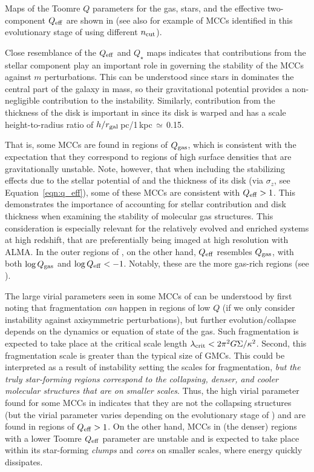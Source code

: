 \IfFileExists{emulateapjlegacy.cls}{\documentclass[iop]{emulateapjlegacy}}{\documentclass[iop]{emulateapj}}
\begin{document}
Maps of the Toomre $Q$ parameters for the gas, stars, and the effective two-component $Q_{\rm eff}$ are shown in 
(see also  for example of MCCs identified in this evolutionary stage of \flower
using different $n_{\rm cut}$). 

Close resemblance of the $Q_{\rm eff}$ and $Q_{\star}$ maps indicates that contributions from the stellar component play an important role in governing the stability of the MCCs against $m$ perturbations. This can be understood since stars in \flower dominates the central part of the galaxy in mass, so their gravitational potential provides a non-negligible contribution to the instability.
Similarly, contribution from the thickness of the disk is important in \flower since its disk is warped and 
has a scale height-to-radius ratio of $h/r_{\rm gal}$\,pc/1\,kpc\,$\simeq$\,0.15.

That is, some MCCs are found in regions of $Q_{\rm gas}$, which is consistent with the expectation that 
they correspond to regions of high surface densities that are gravitationally unstable. 
Note, however, that when including the stabilizing effects due to the stellar potential of \flower and the
thickness of its disk (via $\sigma_z$, see Equation~\ref{eqn:q_eff}), some of these MCCs are
consistent with $Q_{\rm eff} > 1$. 
This demonstrates the importance of accounting for stellar contribution and disk thickness 
when examining the stability of molecular gas structures.
This consideration is especially relevant for the relatively evolved and enriched systems at high redshift,
that are preferentially being imaged at high resolution with ALMA.
In the outer regions of \flower, on the other hand, $Q_{\rm eff}$ resembles $Q_{\rm gas}$, with 
both $\log{Q_{\rm gas}}$ and $\log{Q_{\rm eff}} < -1$. 
Notably, these are the more gas-rich regions (see ).

The large virial parameters seen in some MCCs of \flower can be understood 
by first noting that fragmentation {\em can} happen in regions of low $Q$ 
(if we only consider instability against axisymmetric perturbations), 
but further evolution/collapse depends on the dynamics or equation of state of the gas.
%
Such fragmentation is expected to take place at the critical scale length $\lambda_{\rm crit} < 2 \pi^2 G \Sigma / \kappa^2$. 
Second, this fragmentation scale is greater than the typical size of GMCs. 
% 
This could be interpreted as a result of instability setting the scales for fragmentation, 
{\em but the truly star-forming regions correspond to the collapsing, denser, and cooler molecular structures that are on smaller scales}.
%
Thus, the high virial parameter found for some MCCs in \flower 
indicates that they are not the collapsing structures (but the virial parameter varies depending on the evolutionary stage 
of \flower) and are found in regions of $Q_{\rm eff}>1$.
On the other hand, MCCs in (the denser) regions with a lower Toomre $Q_{\rm eff}$ parameter are unstable
and \SF is expected to take place within its star-forming {\it clumps} and {\it cores} on smaller scales, 
where energy quickly dissipates. %
\end{document}
